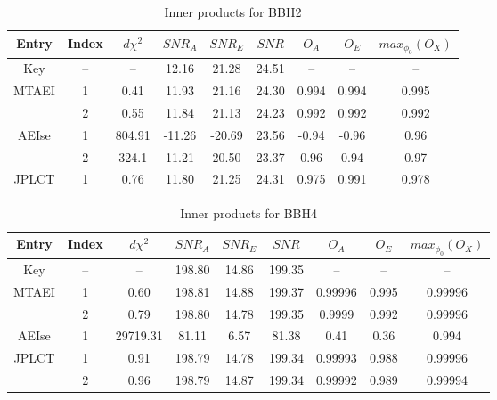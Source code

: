 \documentclass[prd,aps,amsfonts,amsmath, nofootinbib]{revtex4}
\begin{document}
\begin{table}
\caption{\label{BBH2} Inner products for BBH2}
\begin{ruledtabular}
\begin{tabular}{|c|c|c|c|c|c|c|c|c|}
Entry & Index & $d\chi^2$ & $SNR_A$ & $SNR_E$ & $SNR$ & $O_A$ & $O_E$ & $max_{\phi_0}(O_X)$\\
\hline
Key & -- & -- & 12.16 & 21.28 & 24.51 & -- & -- & -- \\
\hline
MTAEI & 1 & 0.41 & 11.93 & 21.16 & 24.30 & 0.994 & 0.994 & 0.995 \\
      & 2 & 0.55 & 11.84 & 21.13 & 24.23 & 0.992 & 0.992 & 0.992 \\
\hline
AEIse & 1 & 804.91 & -11.26  & -20.69 & 23.56 &  -0.94 & -0.96 & 0.96 \\
      & 2 & 324.1 & 11.21 & 20.50 & 23.37 & 0.96 & 0.94 & 0.97 \\
\hline
JPLCT & 1 & 0.76 & 11.80 & 21.25 & 24.31 & 0.975 & 0.991 & 0.978\\
\hline
\end{tabular}
\end{ruledtabular}
\end{table}

\begin{table}
\caption{\label{BBH4} Inner products for BBH4}
\begin{ruledtabular}
\begin{tabular}{|c|c|c|c|c|c|c|c|c|}
Entry & Index & $d\chi^2$ & $SNR_A$ & $SNR_E$ & $SNR$ & $O_A$ & $O_E$ & $max_{\phi_0}(O_X)$\\
\hline
Key & -- & -- & 198.80 & 14.86 & 199.35 & -- & -- & -- \\
\hline
MTAEI & 1 & 0.60 & 198.81 & 14.88 & 199.37 & 0.99996 & 0.995 & 0.99996 \\
      & 2 & 0.79 & 198.80 & 14.78 & 199.35 & 0.9999  & 0.992 &  0.99996\\
\hline
AEIse & 1 & 29719.31 & 81.11 & 6.57 & 81.38 & 0.41  & 0.36 & 0.994 \\
\hline
JPLCT & 1 & 0.91 & 198.79 & 14.78 & 199.34 & 0.99993 &  0.988 & 0.99996\\
      & 2 & 0.96 & 198.79 & 14.87 & 199.34 & 0.99992 & 0.989 & 0.99994 \\
\hline
\end{tabular}
\end{ruledtabular}
\end{table}
\end{document}
